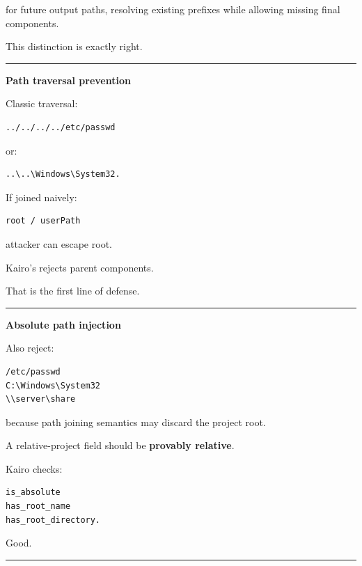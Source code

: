 for future output paths, resolving existing prefixes while allowing missing final components.

This distinction is exactly right.

\begin{center}\rule{0.5\linewidth}{0.5pt}\end{center}

\textbf{Path traversal prevention}

Classic traversal:

\begin{verbatim}
../../../../etc/passwd
\end{verbatim}

or:

\begin{verbatim}
..\..\Windows\System32.
\end{verbatim}

If joined naively:

\begin{verbatim}
root / userPath
\end{verbatim}

attacker can escape root.

Kairo's  rejects parent components.

That is the first line of defense.

\begin{center}\rule{0.5\linewidth}{0.5pt}\end{center}

\textbf{Absolute path injection}

Also reject:

\begin{verbatim}
/etc/passwd
C:\Windows\System32
\\server\share
\end{verbatim}

because path joining semantics may discard the project root.

A relative-project field should be \textbf{provably relative}.

Kairo checks:

\begin{verbatim}
is_absolute
has_root_name
has_root_directory.
\end{verbatim}

Good.

\begin{center}\rule{0.5\linewidth}{0.5pt}\end{center}

